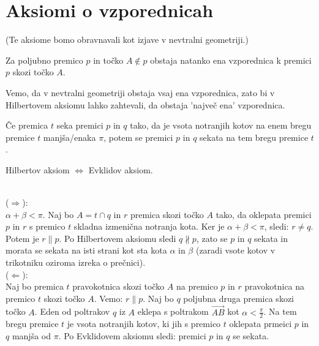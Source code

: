\chapter{Aksiomi o vzporednicah}

(Te aksiome bomo obravnavali kot izjave v nevtralni geometriji.)

\begin{aksiom}
    Za poljubno premico $p$ in točko $A\notin p$ obstaja natanko ena vzporednica k premici $p$ skozi točko $A$.
\end{aksiom}

\begin{opomba}
    Vemo, da v nevtralni geometriji obstaja vsaj ena vzporednica, zato bi v Hilbertovem aksiomu lahko zahtevali, da obstaja 'največ ena' vzporednica.
\end{opomba}

\begin{aksiom}
    Če premica $t$ seka premici $p$ in $q$ tako, da je vsota notranjih kotov na enem bregu premice $t$ manjša/enaka $\pi$, potem se premici $p$ in $q$ sekata na tem bregu premice $t$.
\end{aksiom}

\begin{izrek}
    Hilbertov aksiom $\Leftrightarrow$ Evklidov aksiom.
\end{izrek}

    \begin{dokaz}
        \\ ($\Rightarrow$):
        \\ $\alpha+\beta<\pi$. Naj bo $A=t\cap q$ in $r$ premica skozi točko $A$ tako, da oklepata premici $p$ in $r$ s premico $t$ skladna izmenična notranja kota. Ker je $\alpha+\beta<\pi$, sledi: $r\neq q$. Potem je $r\parallel p$. Po Hilbertovem aksiomu sledi $q \nparallel p$, zato se $p$ in $q$ sekata in morata se sekata na isti  strani kot sta kota $\alpha$ in $\beta$ (zaradi vsote kotov v trikotniku oziroma izreka o prečnici).
        \\ ($\Leftarrow$):
        \\ Naj bo premica $t$ pravokotnica skozi točko $A$ na premico $p$ in $r$ pravokotnica na premico $t$ skozi točko $A$. Vemo: $r \parallel p$. Naj bo $q$ poljubna druga premica skozi točko $A$. Eden od poltrakov $q$ iz $A$ eklepa s poltrakom $\overrightarrow{AB}$ kot $\alpha<\frac{\pi}{2}$. Na tem bregu premice $t$ je vsota notranjih kotov, ki jih s premico $t$ oklepata prmeici $p$ in $q$ manjša od $\pi$. Po Evklidovem aksiomu sledi: premici $p$ in $q$ se sekata.
    \end{dokaz}

